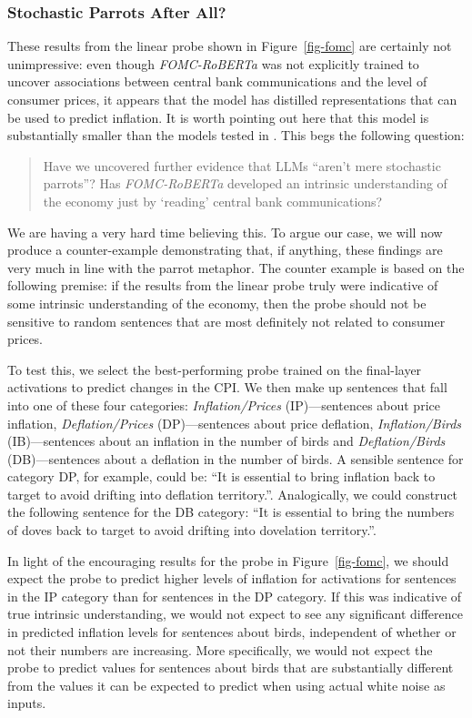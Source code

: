 \documentclass{article}
\theoremstyle{plain}
\theoremstyle{definition}
\theoremstyle{remark}
\begin{document}
\subsubsection{Stochastic Parrots After
All?}\label{stochastic-parrots-after-all}

These results from the linear probe shown in Figure~\ref{fig-fomc} are
certainly not unimpressive: even though \emph{FOMC-RoBERTa} was not
explicitly trained to uncover associations between central bank
communications and the level of consumer prices, it appears that the
model has distilled representations that can be used to predict
inflation. It is worth pointing out here that this model is
substantially smaller than the models tested in \cite{gurnee2023language}. This begs the following question:

\begin{quote}
Have we uncovered further evidence that LLMs ``aren't mere stochastic
parrots''? Has \emph{FOMC-RoBERTa} developed an intrinsic understanding
of the economy just by `reading' central bank communications?
\end{quote}

We are having a very hard time believing this. To argue our case, we will now produce a counter-example demonstrating that, if anything, these findings are very much in line with the parrot metaphor. The counter example is based on the following premise: if the results from the linear probe truly were indicative of some intrinsic understanding of the economy, then the probe should not be sensitive to random sentences  that are most definitely not related to consumer prices.

To test this, we select the best-performing probe trained on the final-layer activations to predict changes in the CPI. We then make up sentences that fall into one of these four categories: \emph{Inflation/Prices} (IP)---sentences about price inflation, \emph{Deflation/Prices} (DP)---sentences about price deflation, \emph{Inflation/Birds} (IB)---sentences about an inflation in the number of birds and \emph{Deflation/Birds} (DB)---sentences about a deflation in the number of birds. A sensible sentence for category DP, for example, could be: ``It is essential to bring inflation back to target to avoid drifting into deflation territory.''. Analogically, we could construct the following sentence for the DB category: ``It is essential to bring the numbers of doves back to target to avoid drifting into dovelation territory.''.

In light of the encouraging results for the probe in
Figure~\ref{fig-fomc}, we should expect the probe to predict higher
levels of inflation for activations for sentences in the IP category
than for sentences in the DP category. If this was indicative of true
intrinsic understanding, we would not expect to see any significant
difference in predicted inflation levels for sentences about birds,
independent of whether or not their numbers are increasing. More
specifically, we would not expect the probe to predict values for
sentences about birds that are substantially different from the values
it can be expected to predict when using actual white noise as inputs.
\end{document}

